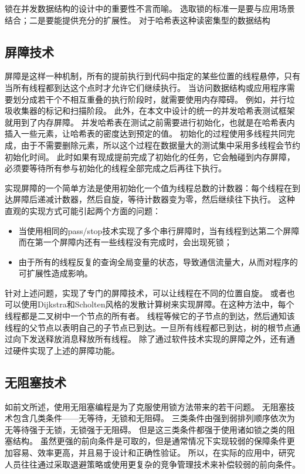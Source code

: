 锁在并发数据结构的设计中的重要性不言而喻。
选取锁的标准一是要与应用场景结合；二是要能提供充分的扩展性。
对于哈希表这种读密集型的数据结构

\subsection{屏障技术}

屏障是这样一种机制，所有的提前执行到代码中指定的某些位置的线程悬停，只有当所有线程都到达这个点时才允许它们继续执行。 当访问数据结构或应用程序需要划分成若干个不相互重叠的执行阶段时，就需要使用内存障碍。
例如，并行垃圾收集器的标记和扫描阶段。
此外，在本文中设计的统一的并发哈希表测试框架就用到了内存屏障。
并发哈希表在测试之前需要进行初始化，也就是在哈希表内插入一些元素，让哈希表的密度达到预定的值。
初始化的过程使用多线程共同完成，由于不需要删除元素，所以这个过程在数据量大的测试集中采用多线程会节约初始化时间。
此时如果有现成提前完成了初始化的任务，它会触碰到内存屏障，必须要等待所有参与初始化的线程全部完成之后再往下执行。

实现屏障的一个简单方法是使用初始化一个值为线程总数的计数器：每个线程在到达屏障后递减计数器，然后自旋，等待计数器变为零，然后继续往下执行。
这种直观的实现方式可能引起两个方面的问题：
\begin{itemize}
	\item 当使用相同的pass/stop技术实现了多个串行屏障时，当有线程到达第二个屏障而在第一个屏障内还有一些线程没有完成时，会出现死锁；
	\item 由于所有的线程反复的查询全局变量的状态，导致通信流量大，从而对程序的可扩展性造成影响。
\end{itemize}
针对上述问题，实现了专门的屏障技术，可以让线程在不同的位置自旋\cite{brooks1986butterfly,hensgen1988two,mellor1992fast,tseng2016scalable}。
或者也可以使用Dijkstra和Scholten风格的发散计算树来实现屏障\cite{dijkstra1980termination}。在这种方法中，每个线程都是二叉树中一个节点的所有者。
线程等候它的子节点的到达，然后通知该线程的父节点以表明自己的子节点已到达。一旦所有线程都已到达，树的根节点通过向下发送释放消息释放所有线程。
除了通过软件技术实现的屏障之外，还有通过硬件实现了上述的屏障功能\cite{solihin2015fundamentals}。

\subsection{无阻塞技术}

如前文所述，使用无阻塞编程是为了克服使用锁方法带来的若干问题。
无阻塞技术包含几类条件——无等待\cite{lamport1974new,herlihy1991wait}，无锁\cite{herlihy1991wait}和无阻碍\cite{herlihy2003obstruction}。
三类条件由强到弱排列顺序依次为无等待强于无锁，无锁强于无阻碍。
但是这三类条件都强于使用诸如锁之类的阻塞结构。
虽然更强的前向条件是可取的，但是通常情况下实现较弱的保障条件更加容易、效率更高，并且易于设计和正确性验证。
所以，在实际的应用中，研究人员往往通过采取退避策略\cite{agarwal1989adaptive}或使用更复杂的竞争管理技术\cite{herlihy2003software}来补偿较弱的前向条件。

